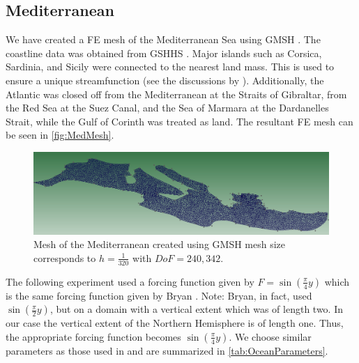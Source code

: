 \subsection*{Mediterranean}
We have created a FE mesh of the Mediterranean Sea using GMSH \cite{GMSH}.
The coastline data was obtained from GSHHS \cite{GSHHS}. Major islands such as
Corsica, Sardinia, and Sicily were connected to the nearest land mass.  This is
used to ensure a unique streamfunction (see the discussions by
\cite{Gunzburger89,van-Gijzen1998}).  Additionally, the Atlantic was closed off
from the Mediterranean at the Straits of Gibraltar, from the Red Sea at the Suez
Canal, and the Sea of Marmara at the Dardanelles Strait, while the Gulf of
Corinth was treated as land. The resultant FE mesh can be seen in
\autoref{fig:MedMesh}.

\begin{figure}
  \begin{center}
    \includegraphics[scale=0.5]{Figures/MediterraneanMesh.png}
    \caption{Mesh of the Mediterranean created using GMSH \cite{GMSH} mesh size
    corresponds to $h=\frac{1}{320}$ with $DoF=240,342$.}
    \label{fig:MedMesh}
  \end{center}
\end{figure}

The following experiment used a forcing function given by $F =
\sin(\frac{\pi}{4} y)$ which is the same forcing function given by Bryan
\cite{Bryan1963}. Note: Bryan, in fact, used $\sin(\frac{\pi}{2} y)$, but on a
domain with a vertical extent which was of length two. In our case the vertical
extent of the Northern Hemisphere is of length one. Thus, the appropriate forcing
function becomes $\sin(\frac{\pi}{4} y)$. We choose similar parameters as those
used in \cite{delSastre04} and are summarized in \autoref{tab:OceanParameters}.

